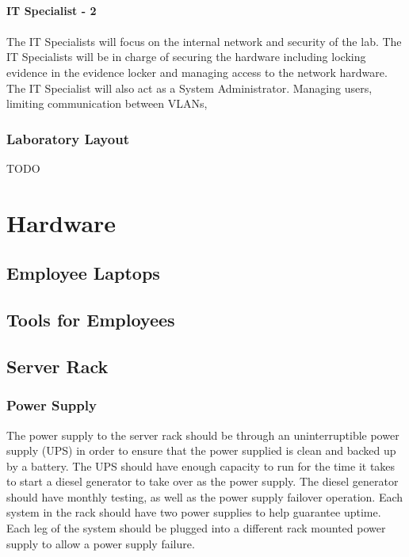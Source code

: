 \documentclass{article}
\begin{document}
\paragraph{IT Specialist - 2}
\paragraph{} The IT Specialists will focus on the internal network and security of the lab.  The IT Specialists will be in charge of securing the hardware including locking evidence in the evidence locker and managing access to the network hardware. The IT Specialist will also act as a System Administrator.  Managing users, limiting communication between VLANs,
\subsubsection{Laboratory Layout}
TODO


\section{Hardware}
\subsection{Employee Laptops} 
\subsection{Tools for Employees} 
\subsection{Server Rack}
\subsubsection{Power Supply} The power supply to the server rack should be through an uninterruptible power supply (UPS) in order to ensure that the power supplied is clean and backed up by a battery. The UPS should have enough capacity to run for the time it takes to start a diesel generator to take over as the power supply. The diesel generator should have monthly testing, as well as the power supply failover operation. Each system in the rack should have two power supplies to help guarantee uptime. Each leg of the system should be plugged into a different rack mounted power supply to allow a power supply failure. 
\end{document}
